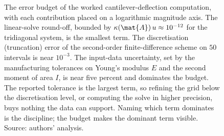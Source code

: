 \begin{figure}[ht]
\centering
{}
\caption[Error budget of the case-study deflection computation]{The error
budget of the worked cantilever-deflection computation, with each
contribution placed on a logarithmic magnitude axis. The linear-solve
round-off, bounded by $\kappa(\mat{A})\,u \approx 10^{-12}$ for the
tridiagonal system, is the smallest term. The discretisation (truncation)
error of the second-order finite-difference scheme on $50$ intervals is near
$10^{-3}$. The input-data uncertainty, set by the manufacturing tolerances
on Young's modulus $E$ and the second moment of area $I$, is near five
percent and dominates the budget. The reported tolerance is the largest
term, so refining the grid below the discretisation level, or computing the
solve in higher precision, buys nothing the data can support. Naming which
term dominates is the discipline; the budget makes the dominant term
visible. Source: authors' analysis.}
\label{fig:vol02:ch16:error-budget}
\end{figure}
